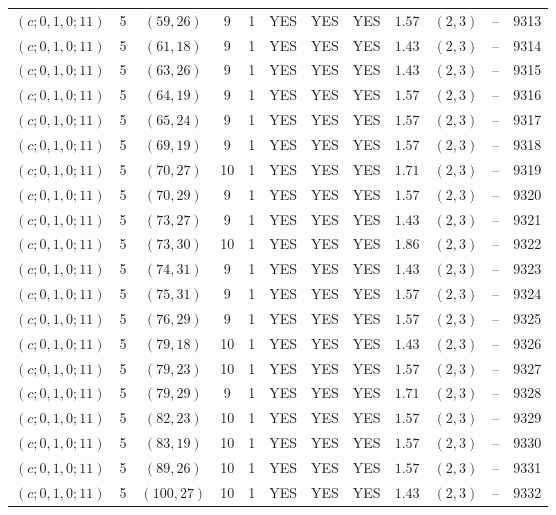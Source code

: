 \begin{longtable}{|c|c|c|c|c|c|c|c|c|c|c|c|}
$(c;0,1,0;11)$ & 5 & $(59,26)$ & 9 & 1 & YES & YES & YES & $1.57$ & $(2,3)$ & -- & 9313\\
$(c;0,1,0;11)$ & 5 & $(61,18)$ & 9 & 1 & YES & YES & YES & $1.43$ & $(2,3)$ & -- & 9314\\
$(c;0,1,0;11)$ & 5 & $(63,26)$ & 9 & 1 & YES & YES & YES & $1.43$ & $(2,3)$ & -- & 9315\\
$(c;0,1,0;11)$ & 5 & $(64,19)$ & 9 & 1 & YES & YES & YES & $1.57$ & $(2,3)$ & -- & 9316\\
$(c;0,1,0;11)$ & 5 & $(65,24)$ & 9 & 1 & YES & YES & YES & $1.57$ & $(2,3)$ & -- & 9317\\
$(c;0,1,0;11)$ & 5 & $(69,19)$ & 9 & 1 & YES & YES & YES & $1.57$ & $(2,3)$ & -- & 9318\\
$(c;0,1,0;11)$ & 5 & $(70,27)$ & 10 & 1 & YES & YES & YES & $1.71$ & $(2,3)$ & -- & 9319\\
$(c;0,1,0;11)$ & 5 & $(70,29)$ & 9 & 1 & YES & YES & YES & $1.57$ & $(2,3)$ & -- & 9320\\
$(c;0,1,0;11)$ & 5 & $(73,27)$ & 9 & 1 & YES & YES & YES & $1.43$ & $(2,3)$ & -- & 9321\\
$(c;0,1,0;11)$ & 5 & $(73,30)$ & 10 & 1 & YES & YES & YES & $1.86$ & $(2,3)$ & -- & 9322\\
$(c;0,1,0;11)$ & 5 & $(74,31)$ & 9 & 1 & YES & YES & YES & $1.43$ & $(2,3)$ & -- & 9323\\
$(c;0,1,0;11)$ & 5 & $(75,31)$ & 9 & 1 & YES & YES & YES & $1.57$ & $(2,3)$ & -- & 9324\\
$(c;0,1,0;11)$ & 5 & $(76,29)$ & 9 & 1 & YES & YES & YES & $1.57$ & $(2,3)$ & -- & 9325\\
$(c;0,1,0;11)$ & 5 & $(79,18)$ & 10 & 1 & YES & YES & YES & $1.43$ & $(2,3)$ & -- & 9326\\
$(c;0,1,0;11)$ & 5 & $(79,23)$ & 10 & 1 & YES & YES & YES & $1.57$ & $(2,3)$ & -- & 9327\\
$(c;0,1,0;11)$ & 5 & $(79,29)$ & 9 & 1 & YES & YES & YES & $1.71$ & $(2,3)$ & -- & 9328\\
$(c;0,1,0;11)$ & 5 & $(82,23)$ & 10 & 1 & YES & YES & YES & $1.57$ & $(2,3)$ & -- & 9329\\
$(c;0,1,0;11)$ & 5 & $(83,19)$ & 10 & 1 & YES & YES & YES & $1.57$ & $(2,3)$ & -- & 9330\\
$(c;0,1,0;11)$ & 5 & $(89,26)$ & 10 & 1 & YES & YES & YES & $1.57$ & $(2,3)$ & -- & 9331\\
$(c;0,1,0;11)$ & 5 & $(100,27)$ & 10 & 1 & YES & YES & YES & $1.43$ & $(2,3)$ & -- & 9332\\

\end{longtable}
